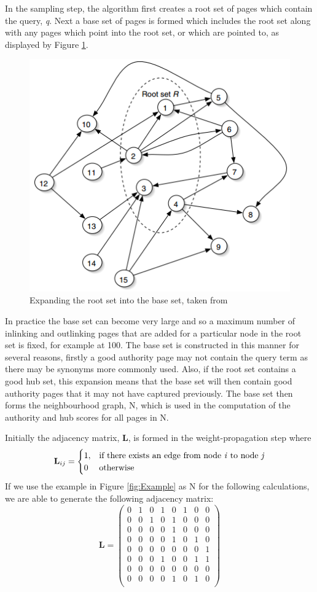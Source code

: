 \documentclass[11pt]{report}
\begin{document}
In the sampling step, the algorithm first creates a root set of pages which contain the query, \textit{q}. Next a base set of pages is formed which includes the root set along with any pages which point into the root set, or which are pointed to, as displayed by Figure \ref{fig:HITS expanding}. 
\begin{figure}[h]
\centering
\includegraphics[width=0.5\linewidth]{expand_baldi.png}
\caption{Expanding the root set into the base set, taken from \cite{baldi2003modeling}}
\label{fig:HITS expanding}
\end{figure}

In practice the base set can become very large and so a maximum number of inlinking and outlinking pages that are added for a particular node in the root set is fixed, for example at 100. The base set is constructed in this manner for several reasons, firstly a good authority page may not contain the query term  as there may be synonyms more commonly used. Also, if the root set contains a good hub set, this expansion means that the base set will then contain good authority pages that it may not have captured previously. The base set then forms the neighbourhood graph, N, which is used in the computation of the authority and hub scores for all pages in N.

Initially the adjacency matrix, \textbf{L}, is formed in the weight-propagation step where \[\textbf{L}_{ij} = \begin{cases} 1, & \textnormal{if there exists an edge from node \textit{i} to node \textit{j}}\\ 0 & \textnormal{otherwise}
\end{cases}\]
If we use the example in Figure \ref{fig:Example} as N for the following calculations, we are able to generate the following adjacency matrix:
\begin{equation*}
\textbf{L}=\left(
\begin{array}{cccccccc}
0 & 1 & 0 & 1 & 0 & 1 & 0 & 0 \\
0 & 0 & 1 & 0 & 1 & 0 & 0 & 0 \\
0 & 0 & 0 & 0 & 1 & 0 & 0 & 0 \\
0 & 0 & 0 & 0 & 1 & 0 & 1 & 0 \\
0 & 0 & 0 & 0 & 0 & 0 & 0 & 1 \\
0 & 0 & 0 & 1 & 0 & 0 & 1 & 1 \\
0 & 0 & 0 & 0 & 0 & 0 & 0 & 0 \\
0 & 0 & 0 & 0 & 1 & 0 & 1 & 0 \\
\end{array}
\right)
\end{equation*} 
\end{document}
